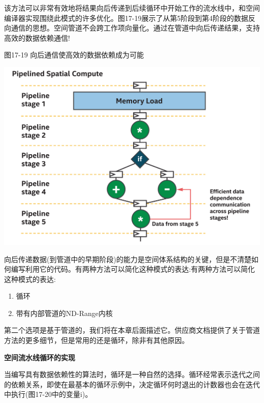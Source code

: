 该方法可以非常有效地将结果向后传递到后续循环中开始工作的流水线中，和空间编译器实现围绕此模式的许多优化。图17-19展示了从第5阶段到第4阶段的数据反向通信的思想。空间管道不会跨工作项向量化。通过在管道中向后传递结果，支持高效的数据依赖通信!\par

\hspace*{\fill} \par %
图17-19 向后通信使高效的数据依赖成为可能
\begin{center}
	\includegraphics[width=1.0\textwidth]{content/chapter-17/images/16}
\end{center}

向后传递数据(到管道中的早期阶段)的能力是空间体系结构的关键，但是不清楚如何编写利用它的代码。有两种方法可以简化这种模式的表达:有两种方法可以简化这种模式的表达:\par

\begin{enumerate}
	\item 循环
	\item 带有内部管道的ND-Range内核
\end{enumerate}

第二个选项是基于管道的，我们将在本章后面描述它。供应商文档提供了关于管道方法的更多细节，但是常用的还是循环，除非有其他原因。\par

\hspace*{\fill} \par %
\textbf{空间流水线循环的实现}

当编写具有数据依赖性的算法时，循环是一种自然的选择。循环经常表示迭代之间的依赖关系，即使在最基本的循环示例中，决定循环何时退出的计数器也会在迭代中执行(图17-20中的变量i)。\par

